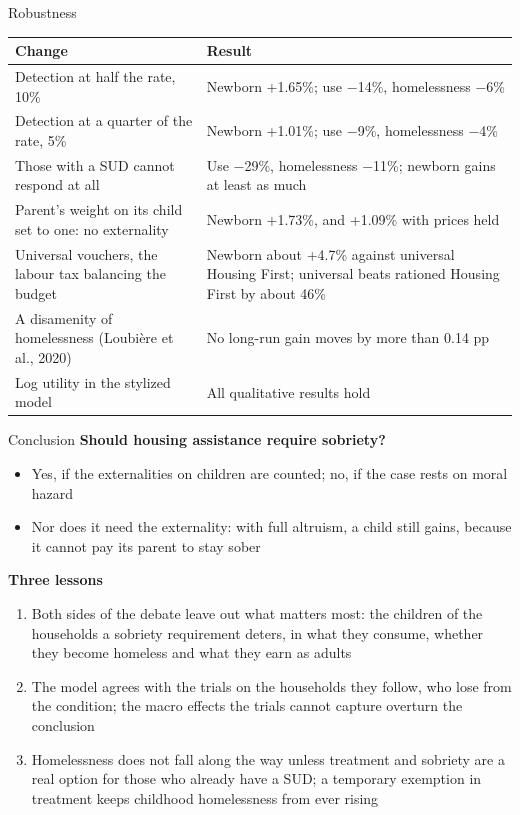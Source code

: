 \documentclass[aspectratio=169,11pt]{beamer}
\newcommand{\HF}{Housing First}
\begin{document}
\begin{frame}{Robustness}
\centering\small
\begin{tabular}{@{}>{\raggedright\arraybackslash}p{6.2cm}>{\raggedright\arraybackslash}p{7.2cm}@{}}
\toprule
Change & Result\\
\midrule
Detection at half the rate, 10\% & Newborn +1.65\%; use $-$14\%, homelessness $-$6\%\\
Detection at a quarter of the rate, 5\% & Newborn +1.01\%; use $-$9\%, homelessness $-$4\%\\
Those with a SUD cannot respond at all & Use $-$29\%, homelessness $-$11\%; newborn gains at least as much\\
Parent's weight on its child set to one: no externality & Newborn +1.73\%, and +1.09\% with prices held\\
Universal vouchers, the labour tax balancing the budget & Newborn about +4.7\% against universal \HF{}; universal beats rationed \HF{} by about 46\%\\
A disamenity of homelessness (Loubi\`ere et al., 2020) & No long-run gain moves by more than 0.14 pp\\
Log utility in the stylized model & All qualitative results hold\\
\bottomrule
\end{tabular}
\end{frame}

\begin{frame}{Conclusion}
\textbf{Should housing assistance require sobriety?}
\begin{itemize}
\item \alert{Yes}, if the externalities on children are counted; \alert{no}, if the case rests on moral hazard
\item Nor does it need the externality: with full altruism, a child still gains, because it cannot pay its parent to stay sober
\end{itemize}
\vspace{0.1cm}
\textbf{Three lessons}
\small
\begin{enumerate}\setlength\itemsep{0.25em}
\item Both sides of the debate leave out what matters most: the children of the households a sobriety requirement deters, in what they consume, whether they become homeless and what they earn as adults
\item The model agrees with the trials on the households they follow, who lose from the condition; the macro effects the trials cannot capture overturn the conclusion
\item Homelessness does not fall along the way unless treatment and sobriety are a real option for those who already have a SUD; a temporary exemption in treatment keeps childhood homelessness from ever rising
\end{enumerate}
\end{frame}
\end{document}
